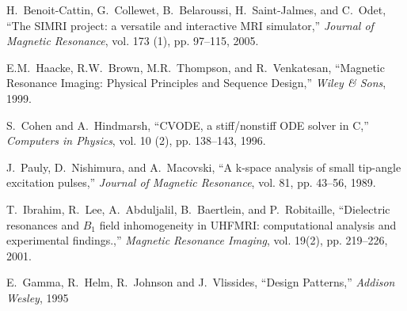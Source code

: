\documentclass{nic-series}
\begin{document}
\begin{thebibliography}{10}
H.~Benoit-Cattin, G.~Collewet, B.~Belaroussi, H.~Saint-Jalmes, and C.~Odet,
  ``The {SIMRI} project: a versatile and interactive {MRI} simulator,''
  \emph{Journal of Magnetic Resonance}, vol. 173 (1), pp. 97--115, 2005.

E.M.~Haacke, R.W.~Brown, M.R.~Thompson, and R.~Venkatesan, ``Magnetic Resonance Imaging: Physical Principles and Sequence Design,''
  \emph{Wiley \& Sons}, 1999.

S.~Cohen and A.~Hindmarsh, ``{CVODE}, a stiff/nonstiff {ODE} solver in {C},''
  \emph{Computers in Physics}, vol. 10 (2), pp. 138--143, 1996.

J.~Pauly, D.~Nishimura, and A.~Macovski, ``A k-space analysis of small tip-angle excitation pulses,''
  \emph{Journal of Magnetic Resonance}, vol. 81, pp. 43--56, 1989.

T.~Ibrahim, R.~Lee, A.~Abduljalil, B.~Baertlein, and P.~Robitaille,
  ``Dielectric resonances and $B_1$ field inhomogeneity in {UHFMRI}:
  computational analysis and experimental findings.,''
  \emph{Magnetic Resonance Imaging}, vol. 19(2), pp. 219--226, 2001.

E.~Gamma, R.~Helm, R.~Johnson and J.~Vlissides,
  ``Design Patterns,''
  \emph{Addison Wesley}, 1995

\end{thebibliography}
\end{document}
